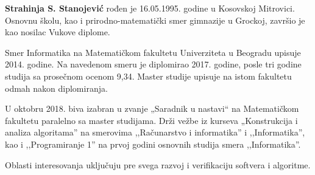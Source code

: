 \documentclass[12pt,oneside]{memoir}
\begin{document}
\begin{biografija}
\textbf{Strahinja S. Stanojević} rođen je 16.05.1995. godine u Kosovskoj Mitrovici. Osnovnu školu, kao i prirodno-matematički smer gimnazije u Grockoj, završio je kao nosilac Vukove diplome. 

Smer Informatika na Matematičkom fakultetu Univerziteta u Beogradu upisuje 2014. godine. Na navedenom smeru je diplomirao 2017. godine, posle tri godine studija sa prosečnom ocenom 9,34. Master studije upisuje na istom fakultetu odmah nakon diplomiranja. 

U oktobru 2018. biva izabran u zvanje „Saradnik u nastavi“ na Matematičkom fakultetu paralelno sa master studijama. Drži vežbe iz kurseva „Konstrukcija i analiza algoritama” na smerovima ,,Računarstvo i informatika'' i ,,Informatika'', kao i ,,Programiranje 1'' na prvoj godini osnovnih studija smera ,,Informatika''. 

Oblasti interesovanja uključuju pre svega razvoj i verifikaciju softvera i algoritme.
\end{biografija}
\end{document}
